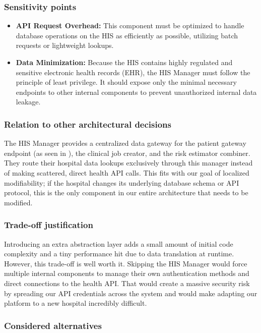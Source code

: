 \subsubsection*{Sensitivity points}
\begin{itemize}
	\item \textbf{API Request Overhead:} This component must be optimized to handle database operations on the HIS as efficiently as possible, utilizing batch requests or lightweight lookups.
	\item \textbf{Data Minimization:} Because the HIS contains highly regulated and sensitive electronic health records (EHR), the HIS Manager must follow the principle of least privilege. It should expose only the minimal necessary endpoints to other internal components to prevent unauthorized internal data leakage.
\end{itemize}

\subsubsection*{Relation to other architectural decisions}
The HIS Manager provides a centralized data gateway for the patient gateway endpoint (as seen in ), the clinical job creator, and the risk estimator combiner. They route their hospital data lookups exclusively through this manager instead of making scattered, direct health API calls. This fits with our goal of localized modifiability; if the hospital changes its underlying database schema or API protocol, this is the only component in our entire architecture that needs to be modified.

\subsubsection*{Trade-off justification}
Introducing an extra abstraction layer adds a small amount of initial code complexity and a tiny performance hit due to data translation at runtime. However, this trade-off is well worth it. Skipping the HIS Manager would force multiple internal components to manage their own authentication methods and direct connections to the health API. That would create a massive security risk by spreading our API credentials across the system and would make adapting our platform to a new hospital incredibly difficult.

\subsubsection*{Considered alternatives}
